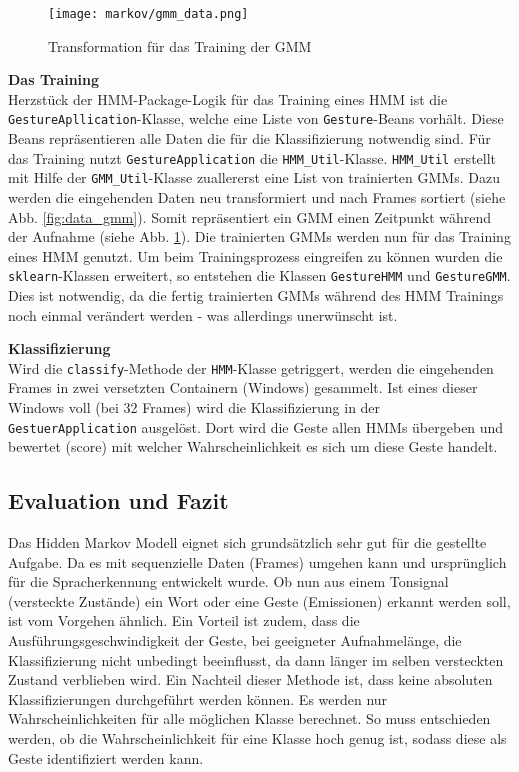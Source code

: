 \begin{figure}[htbp] \centering
    \texttt{[image: markov/gmm\_data.png]}
    \caption{Transformation für das Training der \acl{GMM}}
    \label{fig:gmm_data}
\end{figure}

\textbf{Das Training} \\
Herzstück der HMM-Package-Logik für das Training eines \acl{HMM} ist die \texttt{GestureApllication}-Klasse, welche eine Liste von \texttt{Gesture}-Beans vorhält. 
Diese Beans repräsentieren alle Daten die für 
 die Klassifizierung notwendig sind. Für das Training nutzt \texttt{GestureApplication} die \texttt{HMM\_Util}-Klasse.
\texttt{HMM\_Util} erstellt mit Hilfe der \texttt{GMM\_Util}-Klasse zuallererst eine List von trainierten \acl{GMM}s. Dazu werden die eingehenden Daten 
neu transformiert und nach Frames sortiert (siehe Abb. \ref{fig:data_gmm}). Somit repräsentiert ein \acl{GMM} einen Zeitpunkt während der Aufnahme 
(siehe Abb. \ref{fig:gmm_data}). Die trainierten \acl{GMM}s werden nun für das Training eines \acl{HMM} genutzt. Um beim Trainingsprozess eingreifen zu können
wurden die \texttt{sklearn}-Klassen erweitert, so entstehen die Klassen \texttt{GestureHMM} und \texttt{GestureGMM}. Dies ist notwendig, da die fertig trainierten
\acl{GMM}s während des \acl{HMM} Trainings noch einmal verändert werden - was allerdings unerwünscht ist. 


\textbf{Klassifizierung} \\
Wird die \texttt{classify}-Methode der \texttt{HMM}-Klasse getriggert, werden die eingehenden Frames in zwei versetzten Containern (Windows) gesammelt.
Ist eines dieser Windows voll (bei 32 Frames) wird die Klassifizierung in der \texttt{GestuerApplication} ausgelöst. Dort wird die Geste allen \acl{HMM}s übergeben und
bewertet (score) mit welcher Wahrscheinlichkeit es sich um diese Geste handelt.

\subsection{Evaluation und Fazit}  \label{sec:result}
Das Hidden Markov Modell eignet sich grundsätzlich sehr gut für die gestellte Aufgabe. Da es mit sequenzielle Daten (Frames) umgehen 
kann und ursprünglich für die Spracherkennung entwickelt wurde. Ob nun aus einem Tonsignal (versteckte Zustände) ein Wort oder 
eine Geste (Emissionen) erkannt werden soll, ist vom Vorgehen ähnlich. Ein Vorteil ist zudem, dass die Ausführungsgeschwindigkeit
 der Geste, bei geeigneter Aufnahmelänge, die Klassifizierung nicht unbedingt beeinflusst, da dann länger im selben versteckten 
 Zustand verblieben wird.
Ein Nachteil dieser Methode ist, dass keine absoluten Klassifizierungen durchgeführt werden können. Es werden nur Wahrscheinlichkeiten für alle möglichen Klasse berechnet. 
So muss entschieden werden, ob die Wahrscheinlichkeit für eine Klasse hoch genug ist, sodass diese als Geste identifiziert werden kann.


